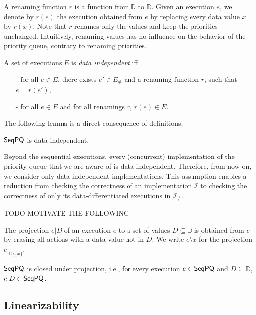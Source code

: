 A renaming function $r$ is a function from $\mathbb{D}$ to $\mathbb{D}$. Given an execution $e$, we denote by $r(e)$ the execution obtained from $e$ by replacing every data value $x$ by $r(x)$. Note that $r$ renames only the values and keep the priorities unchanged. Intuitively, renaming values has no influence on the behavior of the priority queue, contrary to renaming priorities.

\begin{definition}\label{def:priority-value data-independence}
A set of executions $E$ is \emph{data independent} iff
\begin{itemize}
\setlength{\itemsep}{0.5pt}
\item[-] for all $e \in E$, there exists $e' \in E_{\neq}$ and a renaming function $r$, such that $e=r(e')$,

\item[-] for all $e \in E$ and for all renamings $r$, $r(e) \in E$.
\end{itemize}
\end{definition}

The following lemma is a direct consequence of definitions.

\begin{lemma}
$\mathsf{SeqPQ}$ is data independent.
\end{lemma}

Beyond the sequential executions, every (concurrent) implementation of the priority queue that we are aware of is data-independent. Therefore, from now on, we consider only data-independent implementations. This assumption enables a reduction from checking the correctness of an implementation $\mathcal{I}$ to checking the correctness of only its data-differentiated executions in $\mathcal{I}_{\neq}$.

TODO MOTIVATE THE FOLLOWING

The projection $e \vert D$ of an execution $e$ to a set of values $D \subseteq \mathbb{D}$ is obtained from $e$ by erasing all actions with a data value not in $D$. We write $e \setminus x$ for the projection $e \vert_{ \mathbb{D} \setminus \{ x \} }$.

\begin{lemma}
$\mathsf{SeqPQ}$ is closed under projection, i.e., for every execution $e\in \mathsf{SeqPQ}$ and $D \subseteq \mathbb{D}$, $e \vert D\in \mathsf{SeqPQ}$.
\end{lemma}


\subsection{Linearizability}\label{ssec:lin}

